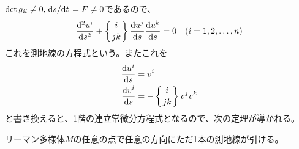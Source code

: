     $\det g_{il} \neq 0, \dv*{s}{t} = F \neq 0$であるので、
        \[
            \begin{aligned}
                \dv[2]{u^i}{s} + \left\{i \atop jk\right\}\dv{u^j}{s}\dv{u^k}{s} &= 0 & (i = 1, 2, \dots, n)
            \end{aligned}
        \]
    これを測地線の方程式という。またこれを
    \begin{align*}
        \dv{u^i}{s} &= v^i\\
        \dv{v^i}{s} &= -\left\{i \atop jk\right\}v^jv^k
    \end{align*}
    と書き換えると、1階の連立常微分方程式となるので、次の定理が導かれる。
    \begin{thm}[測地線]
        リーマン多様体$M$の任意の点で任意の方向にただ1本の測地線が引ける。
    \end{thm}

